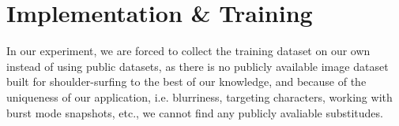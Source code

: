 \section{Implementation \& Training}
\label{sec-implementation-and-training}




In our experiment, we are forced to collect the training dataset on our own instead of using public datasets, as there is no publicly available image dataset built for shoulder-surfing to the best of our knowledge, and because of the uniqueness of our application, i.e. blurriness, targeting characters, working with burst mode snapshots, etc., we cannot find any publicly avaliable substitudes.


